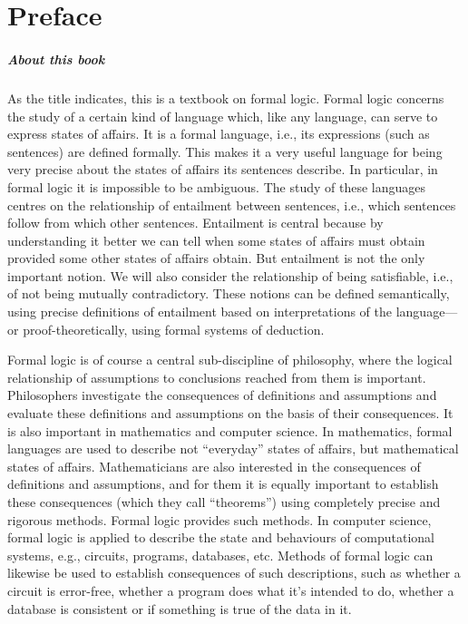 \chapter{Preface}

\paragraph{About this book}

As the title indicates, this is a textbook on formal logic.  Formal logic concerns the study of a certain kind of language which, like any language, can serve to express states of affairs.  It is a formal language, i.e., its expressions (such as sentences) are defined formally.  This makes it a very useful language for being very precise about the states of affairs its sentences describe. In particular, in formal logic it is impossible to be ambiguous. The study of these languages centres on the relationship of entailment between sentences, i.e., which sentences follow from which other sentences.  Entailment is central because by understanding it better we can tell when some states of affairs must obtain provided some other states of affairs obtain.  But entailment is not the only important notion. We will also consider the relationship of being satisfiable, i.e., of not being mutually contradictory.  These notions can be defined semantically, using precise definitions of entailment based on interpretations of the language---or proof-theoretically, using formal systems of deduction.

Formal logic is of course a central sub-discipline of philosophy, where the logical relationship of assumptions to conclusions reached from them is important.  Philosophers investigate the consequences of definitions and assumptions and evaluate these definitions and assumptions on the basis of their consequences. It is also important in mathematics and computer science. In mathematics, formal languages are used to describe not ``everyday'' states of affairs, but mathematical states of affairs. Mathematicians are also interested in the consequences of definitions and assumptions, and for them it is equally important to establish these consequences (which they call ``theorems'') using completely precise and rigorous methods. Formal logic provides such methods.  In computer science, formal logic is applied to describe the state and behaviours of computational systems, e.g., circuits, programs, databases, etc.  Methods of formal logic can likewise be used to establish consequences of such descriptions, such as whether a circuit is error-free, whether a program does what it's intended to do, whether a database is consistent or if something is true of the data in it.

